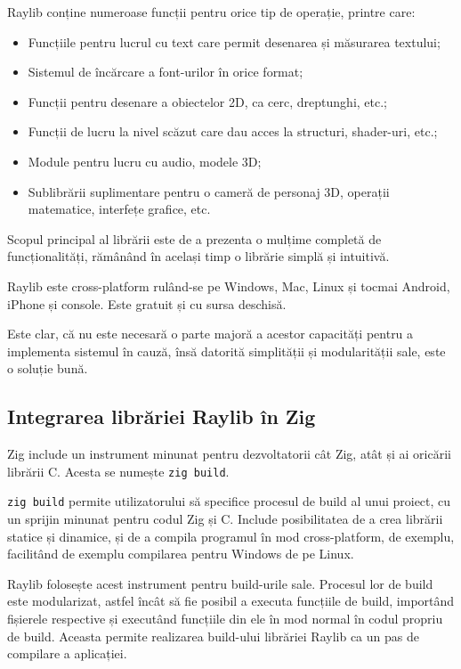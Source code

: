 \documentclass[a4paper,12pt]{report}
\begin{document}
Raylib conține numeroase funcții pentru orice tip de operație, printre care:
\begin{itemize}
    \item Funcțiile pentru lucrul cu text care permit desenarea și măsurarea textului;
    \item Sistemul de încărcare a font-urilor în orice format;
    \item Funcții pentru desenare a obiectelor \ac{2D}, ca cerc, dreptunghi, etc.;
    \item Funcții de lucru la nivel scăzut care dau acces la structuri, shader-uri, etc.;
    \item Module pentru lucru cu audio, modele \ac{3D};
    \item Sublibrării suplimentare pentru o cameră de personaj \ac{3D}, operații matematice, interfețe grafice, etc.
\end{itemize}

Scopul principal al librării este de a prezenta o mulțime completă de funcționalități,
rămânând în același timp o librărie simplă și intuitivă.

Raylib este cross-platform rulând-se pe Windows, Mac, Linux și tocmai Android, iPhone și console.
Este gratuit și cu sursa deschisă.

Este clar, că nu este necesară o parte majoră a acestor capacități pentru a implementa sistemul în cauză,
însă datorită simplității și modularității sale, este o soluție bună.


\subsection{Integrarea librăriei Raylib în Zig}

Zig include un instrument minunat pentru dezvoltatorii cât Zig,
atât și ai oricării librării C. Acesta se numește \texttt{zig build}.

\texttt{zig build} permite utilizatorului să specifice procesul de build al unui proiect,
cu un sprijin minunat pentru codul Zig și C.
Include posibilitatea de a crea librării statice și dinamice, și de a compila programul în mod cross-platform,
de exemplu, facilitând de exemplu compilarea pentru Windows de pe Linux.

Raylib folosește acest instrument pentru build-urile sale.
Procesul lor de build este modularizat, astfel încât să fie posibil a executa funcțiile de build,
importând fișierele respective și executând funcțiile din ele în mod normal în codul propriu de build.
Aceasta permite realizarea build-ului librăriei Raylib ca un pas de compilare a aplicației.
\end{document}
